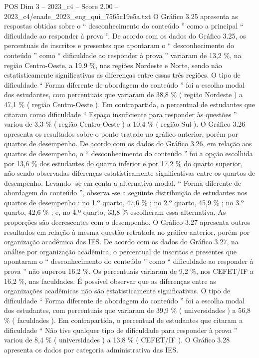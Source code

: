 \begin{textsample}{POS Dim 3 – 2023\_c4 – Score 2.00 – 2023\_c4/enade\_2023\_eng\_qui\_7565c19e5a.txt}
O Gráfico 3.25 apresenta as respostas obtidas sobre o “ desconhecimento do conteúdo ” como a principal “ dificuldade ao responder à prova ”.
De acordo com os dados do Gráfico 3.25, os percentuais de inscritos e presentes que apontaram o “ desconhecimento do conteúdo ” como “ dificuldade ao responder à prova ” variaram de 13,2 \%, na região Centro-Oeste, a 19,9 \%, nas regiões Nordeste e Norte, sendo não estatisticamente significativas as diferenças entre essas três regiões.
O tipo de dificuldade “ Forma diferente de abordagem do conteúdo ” foi a escolha modal dos estudantes, com percentuais que variaram de 38,8 \% ( região Nordeste ) a 47,1 \% ( região Centro-Oeste ).
Em contrapartida, o percentual de estudantes que citaram como dificuldade “ Espaço insuficiente para responder às questões ” variou de 3,3 \% ( região Centro-Oeste ) a 10,4 \% ( região Sul ).
O Gráfico 3.26 apresenta os resultados sobre o ponto tratado no gráfico anterior, porém por quartos de desempenho.
De acordo com os dados do Gráfico 3.26, em relação aos quartos de desempenho, o “ desconhecimento do conteúdo ” foi a opção escolhida por 13,6 \% dos estudantes do quarto inferior e por 17,2 \% do quarto superior, não sendo observadas diferenças estatisticamente significativas entre os quartos de desempenho.
Levando -se em conta a alternativa modal, “ Forma diferente de abordagem do conteúdo ”, observa -se a seguinte distribuição de estudantes nos quartos de desempenho : no 1.º quarto, 47,6 \% ; no 2.º quarto, 45,9 \% ; no 3.º quarto, 42,6 \% ; e, no 4.º quarto, 33,8 \% escolheram essa alternativa.
As proporções são decrescentes com o desempenho.
O Gráfico 3.27 apresenta outros resultados em relação à mesma questão retratada no gráfico anterior, porém por organização acadêmica das IES.
De acordo com os dados do Gráfico 3.27, na análise por organização acadêmica, o percentual de inscritos e presentes que apontaram o “ desconhecimento do conteúdo ” como “ dificuldade ao responder à prova ” não superou 16,2 \%.
Os percentuais variaram de 9,2 \%, nos CEFET/IF a 16,2 \%, nas faculdades.
É possível observar que as diferenças entre as organizações acadêmicas não são estatisticamente significativas.
O tipo de dificuldade “ Forma diferente de abordagem do conteúdo ” foi a escolha modal dos estudantes, com percentuais que variaram de 39,9 \% ( universidades ) a 56,8 \% ( faculdades ).
Em contrapartida, o percentual de estudantes que citaram a dificuldade “ Não tive qualquer tipo de dificuldade para responder à prova ” variou de 8,4 \% ( universidades ) a 13,8 \% ( CEFET/IF ).
O Gráfico 3.28 apresenta os dados por categoria administrativa das IES.

\end{textsample}
